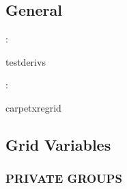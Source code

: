 \vspace{3mm} \subsection*{General}

: 

testderivs
\vspace{2mm}

: 

carpetxregrid
\vspace{2mm}
\subsection*{Grid Variables}
\vspace{5mm}\subsubsection{PRIVATE GROUPS}

\vspace{5mm}

